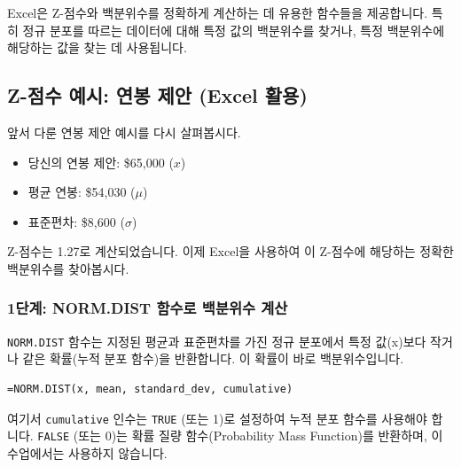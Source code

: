 \documentclass[11pt,a4paper]{article}
\theoremstyle{definition}
\begin{document}
Excel은 Z-점수와 백분위수를 정확하게 계산하는 데 유용한 함수들을 제공합니다. 특히 정규 분포를 따르는 데이터에 대해 특정 값의 백분위수를 찾거나, 특정 백분위수에 해당하는 값을 찾는 데 사용됩니다.

\subsection{Z-점수 예시: 연봉 제안 (Excel 활용)}

앞서 다룬 연봉 제안 예시를 다시 살펴봅시다.
\begin{itemize}
    \item 당신의 연봉 제안: \$65,000 (\(x\))
    \item 평균 연봉: \$54,030 (\(\mu\))
    \item 표준편차: \$8,600 (\(\sigma\))
\end{itemize}
Z-점수는 1.27로 계산되었습니다. 이제 Excel을 사용하여 이 Z-점수에 해당하는 정확한 백분위수를 찾아봅시다.

\subsubsection*{1단계: NORM.DIST 함수로 백분위수 계산}

\texttt{NORM.DIST} 함수는 지정된 평균과 표준편차를 가진 정규 분포에서 특정 값(x)보다 작거나 같은 확률(누적 분포 함수)을 반환합니다. 이 확률이 바로 백분위수입니다.

\begin{lstlisting}[caption={NORM.DIST 함수 사용법}, label={lst:norm_dist}]
=NORM.DIST(x, mean, standard_dev, cumulative)
\end{lstlisting}
여기서 \texttt{cumulative} 인수는 \texttt{TRUE} (또는 1)로 설정하여 누적 분포 함수를 사용해야 합니다. \texttt{FALSE} (또는 0)는 확률 질량 함수(Probability Mass Function)를 반환하며, 이 수업에서는 사용하지 않습니다.
\end{document}
